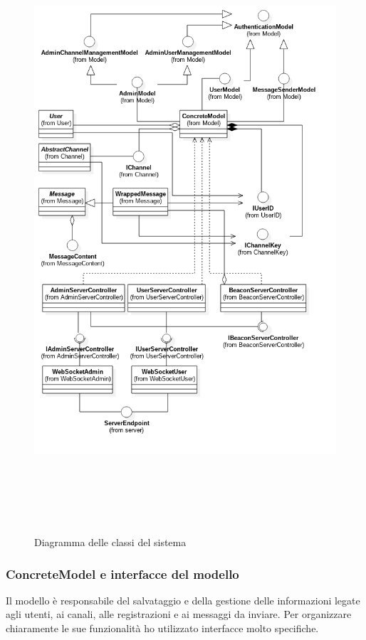 	\begin{figure}[H]
		\begin{center}
			\includegraphics[width=16.5cm,height=22.5cm,keepaspectratio]{UML/png/Design Model__SimpleClasses_6}
			\caption{Diagramma delle classi del sistema}\label{diagrammaclassi}
		\end{center}
	\end{figure}

		\subsubsection{ConcreteModel e interfacce del modello}
	Il modello è responsabile del salvataggio e della gestione delle informazioni legate agli utenti, ai canali, alle registrazioni e ai messaggi da inviare. Per organizzare chiaramente le sue funzionalità ho utilizzato interfacce molto specifiche.


